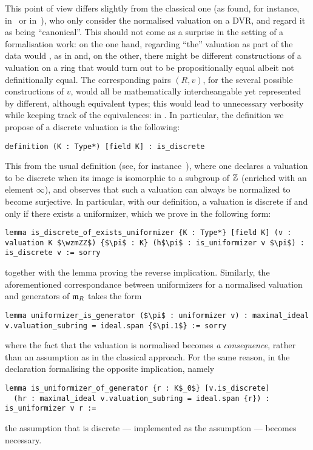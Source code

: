 \documentclass[sigplan,10pt,anonymous,review]{acmart}
\begin{document}
This point of view differs slightly from the classical one (as found, for instance, in~\cite[Chapitre~I]{Ser62} or in~\cite[Chapitre~VII]{Bou07}), who only consider the normalised valuation on a DVR, and regard it as being ``canonical''. This should not come as a surprise in the setting of a formalisation work: on the one hand, regarding ``the'' valuation as part of the data would , as in  and, on the other, there might be different constructions of a valuation on a ring that would turn out to be propositionally equal albeit not definitionally equal. The corresponding pairs $(R,v)$, for the several possible constructions of $v$, would all be mathematically intercheangable yet represented by different, although equivalent types; this would lead to unnecessary verbosity while keeping track of the equivalences: in . In particular, the definition we propose of a discrete valuation is the following:
\begin{lstlisting}
definition (K : Type*) [field K] : is_discrete
\end{lstlisting}
This  from the usual definition (see, for instance~\cite[Proposition~I.1]{Ser62}), where one declares a valuation to be discrete when its image is isomorphic to a subgroup of $\mathbb{Z}$ (enriched with an element $\infty$), and observes that such a valuation can always be normalized to become surjective. In particular, with our definition, a valuation is discrete if and only if there exists a uniformizer, which we prove in the following form:
\begin{lstlisting}
lemma is_discrete_of_exists_uniformizer {K : Type*} [field K] (v : valuation K $\wzmZZ$) {$\pi$ : K} (h$\pi$ : is_uniformizer v $\pi$) : is_discrete v := sorry
\end{lstlisting}
together with the lemma  proving the reverse implication. Similarly, the aforementioned correspondance between uniformizers for a normalised valuation and generators of $\mathfrak{m}_{R}$ takes the form
\begin{lstlisting}
lemma uniformizer_is_generator ($\pi$ : uniformizer v) : maximal_ideal v.valuation_subring = ideal.span {$\pi.1$} := sorry
\end{lstlisting}
where the fact that the valuation is normalised becomes \emph{a consequence}, rather than an assumption as in the classical approach. For the same reason, in the declaration formalising the opposite implication, namely
\begin{lstlisting}
lemma is_uniformizer_of_generator {r : K$_0$} [v.is_discrete]
  (hr : maximal_ideal v.valuation_subring = ideal.span {r}) : is_uniformizer v r :=
\end{lstlisting}
the assumption that  is discrete --- implemented as the  assumption \code{[v.is_discrete]} --- becomes necessary.
\end{document}

